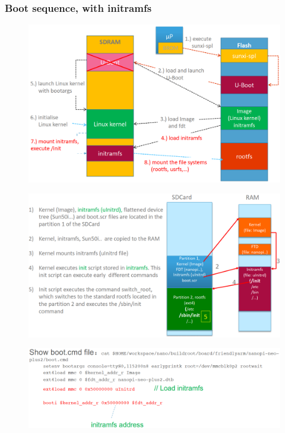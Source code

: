 \documentclass[resume]{subfiles}
\begin{document}
\subsubsection{Boot sequence, with initramfs}

\begin{figure}[H]
    \centering
    \includegraphics[width=1\columnwidth]{Figures/fileSystem/initRamFsBootSeq.png}
    \label{fig:initRamFsBootSeq}
\end{figure}

\begin{figure}[H]
    \centering
    \includegraphics[width=1\columnwidth]{Figures/fileSystem/initRamFsBootSeq2.png}
    \label{fig:initRamFsBootSeq2}
\end{figure}

\begin{figure}[H]
    \centering
    \includegraphics[width=1\columnwidth]{Figures/fileSystem/initRamFsBootSeq3.png}
    \label{fig:initRamFsBootSeq3}
\end{figure}
\end{document}
